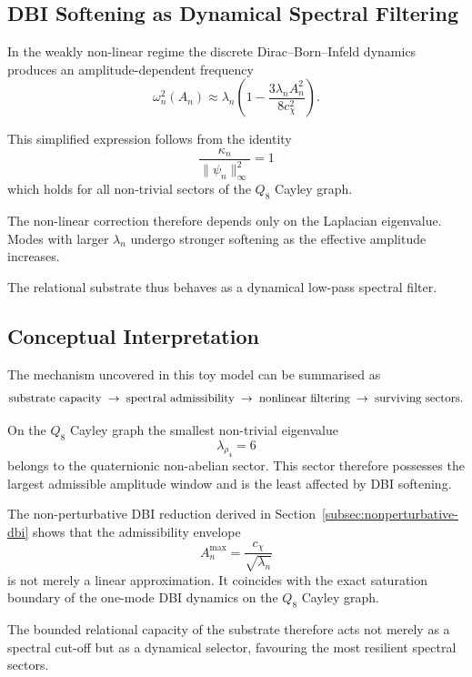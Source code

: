 \documentclass[11pt,a4paper]{article}
\begin{document}
  \subsection{DBI Softening as Dynamical Spectral Filtering}

    In the weakly non-linear regime the discrete Dirac--Born--Infeld dynamics
    produces an amplitude-dependent frequency
    \[
      \omega_n^2(A_n)
      \approx
      \lambda_n
      \left(
        1 -
        \frac{3\lambda_n A_n^2}{8c_\chi^2}
      \right).
    \]

    This simplified expression follows from the identity
    \[
      \frac{\kappa_n}{\|\psi_n\|_\infty^2}=1
    \]
    which holds for all non-trivial sectors of the $Q_8$ Cayley graph.

    The non-linear correction therefore depends only on the Laplacian
    eigenvalue.
    Modes with larger $\lambda_n$ undergo stronger softening as the
    effective amplitude increases.

    The relational substrate thus behaves as a dynamical low-pass spectral
    filter.

  \subsection{Conceptual Interpretation}

    The mechanism uncovered in this toy model can be summarised as
    \[
      \text{sub\-strate capacity}
      \;\rightarrow\;
      \text{spectral admissibility}
      \;\rightarrow\;
      \text{nonlinear filtering}
      \;\rightarrow\;
      \text{surviving sectors}.
    \]

    On the $Q_8$ Cayley graph the smallest non-trivial eigenvalue
    \[
      \lambda_{\rho_4}=6
    \]
    belongs to the quaternionic non-abelian sector.
    This sector therefore possesses the largest admissible amplitude window
    and is the least affected by DBI softening.

    The non-perturbative DBI reduction derived in
    Section~\ref{subsec:nonperturbative-dbi} shows that the admissibility
    envelope
    \[
      A_n^{\max} = \frac{c_\chi}{\sqrt{\lambda_n}}
    \]
    is not merely a linear approximation.
    It coincides with the exact saturation boundary of the one-mode
    DBI dynamics on the $Q_8$ Cayley graph.

    The bounded relational capacity of the substrate therefore acts
    not merely as a spectral cut-off but as a dynamical selector,
    favouring the most resilient spectral sectors.
\end{document}
